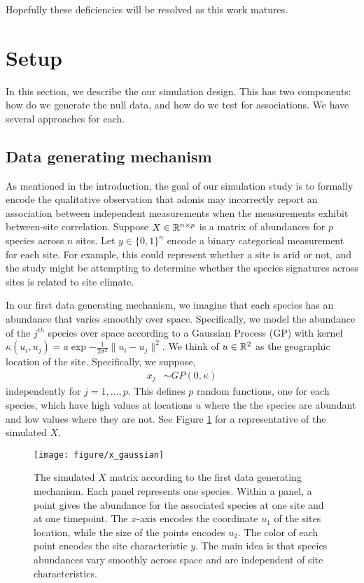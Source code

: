 \documentclass{article}
\begin{document}
Hopefully these deficiencies will be resolved as this work matures.

\section{Setup}
\label{sec:setup}

In this section, we describe the our simulation design. This has two components:
how do we generate the null data, and how do we test for associations. We have
several approaches for each.

\subsection{Data generating mechanism}
\label{subsec:data_generating_mechanism}

As mentioned in the introduction, the goal of our simulation study is to
formally encode the qualitative observation that adonis may incorrectly report
an association between independent measurements when the measurements exhibit
between-site correlation. Suppose $X \in \mathbb{R}^{n \times p}$ is a matrix of
abundances for $p$ species across $n$ sites. Let $y \in \{0, 1\}^{n}$ encode a
binary categorical measurement for each site. For example, this could represent
whether a site is arid or not, and the study might be attempting to determine
whether the species signatures across sites is related to site climate.

In our first data generating mechanism, we imagine that each species has an
abundance that varies smoothly over space. Specifically, we model the abundance
of the $j^{th}$ species over space according to a Gaussian Process (GP) with
kernel
$\kappa\left(u_{i}, u_{j}\right) = a\exp{-\frac{1}{2\sigma^{2}}\|u_{i} - u_{j}\|^{2}}$.
We think of $u \in \mathbb{R}^{2}$ as the geographic location of the site.
Specifically, we suppose,
\begin{align}
  x_{j} &\sim GP\left(0, \kappa\right)
\end{align}
independently for $j = 1, \dots, p$. This defines $p$ random functions, one for
each species, which have high values at locations $u$ where the the species are
abundant and low values where they are not. See Figure \ref{fig:x_gaussian} for
a representative of the simulated $X$.

\begin{figure}
  \centering
  \texttt{[image: figure/x\_gaussian]}
  \caption{\label{fig:x_gaussian} The simulated $X$ matrix according to the
    first data generating mechanism. Each panel represents one species. Within a
    panel, a point gives the abundance for the associated species at one site
    and at one timepoint. The $x$-axis encodes the coordinate $u_{1}$ of the
    sites location, while the size of the points encodes $u_{2}$. The color of
    each point encodes the site characteristic $y$. The main idea is that
    species abundances vary smoothly across space and are independent of site
    characteristics.}
\end{figure}
\end{document}
